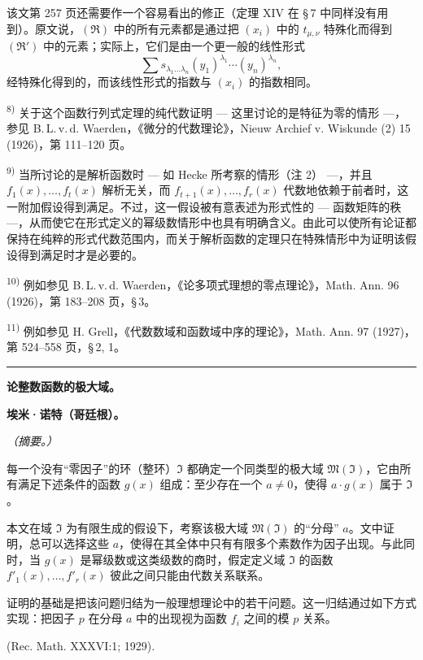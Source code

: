 {该文第 257 页还需要作一个容易看出的修正（定理 XIV 在 \S\,7 中同样没有用到）。原文说，$(\mathfrak{R})$ 中的所有元素都是通过把 $(x_i)$ 中的 $t_{\mu,\nu}$ 特殊化而得到 $(\mathfrak{R}')$ 中的元素；实际上，它们是由一个更一般的线性形式
\[
\sum s_{\lambda_1\ldots\lambda_n}(y_1)^{\lambda_1}\cdots(y_n)^{\lambda_n},
\]
经特殊化得到的，而该线性形式的指数与 $(x_i)$ 的指数相同。

\noindent\textsuperscript{8)} 关于这个函数行列式定理的纯代数证明 --- 这里讨论的是特征为零的情形 ---，参见 B.\,L.\,v.\,d. Waerden，《微分的代数理论》，Nieuw Archief v. Wiskunde (2) 15 (1926)，第 111--120 页。

\noindent\textsuperscript{9)} 当所讨论的是解析函数时 --- 如 Hecke 所考察的情形（注 2） ---，并且 $f_1(x),\ldots,f_t(x)$ 解析无关，而 $f_{t+1}(x),\ldots,f_r(x)$ 代数地依赖于前者时，这一附加假设得到满足。不过，这一假设被有意表述为形式性的 --- 函数矩阵的秩 ---，从而使它在形式定义的幂级数情形中也具有明确含义。由此可以使所有论证都保持在纯粹的形式代数范围内，而关于解析函数的定理只在特殊情形中为证明该假设得到满足时才是必要的。

\noindent\textsuperscript{10)} 例如参见 B.\,L.\,v.\,d. Waerden，《论多项式理想的零点理论》，Math. Ann. 96 (1926)，第 183--208 页，\S\,3。

\noindent\textsuperscript{11)} 例如参见 H. Grell，《代数数域和函数域中序的理论》，Math. Ann. 97 (1927)，第 524--558 页，\S\,2, 1。
}

\bigskip
\begin{center}\rule{4cm}{0.4pt}\end{center}
\begingroup
{}
\begin{center}
{\Large\bfseries 论整数函数的极大域。}\par
\vspace{0.7em}
{\bfseries 埃米·诺特（哥廷根）。}\par
\vspace{0.5em}
\emph{（摘要。）}
\end{center}

每一个没有“零因子”的环（整环）$\mathfrak{I}$ 都确定一个同类型的极大域 $\mathfrak{M}(\mathfrak{I})$，它由所有满足下述条件的函数 $g(x)$ 组成：至少存在一个 $a\ne0$，使得 $a\cdot g(x)$ 属于 $\mathfrak{I}$。

本文在域 $\mathfrak{I}$ 为有限生成的假设下，考察该极大域 $\mathfrak{M}(\mathfrak{I})$ 的“分母” $a$。文中证明，总可以选择这些 $a$，使得在其全体中只有有限多个素数作为因子出现。与此同时，当 $g(x)$ 是幂级数或这类级数的商时，假定定义域 $\mathfrak{I}$ 的函数 $f'_1(x),\ldots,f'_r(x)$ 彼此之间只能由代数关系联系。

证明的基础是把该问题归结为一般理想理论中的若干问题。这一归结通过如下方式实现：把因子 $p$ 在分母 $a$ 中的出现视为函数 $f_i$ 之间的模 $p$ 关系。

\begin{center}
(Rec. Math. XXXVI:1; 1929).
\end{center}
\endgroup

\setcounter{footnote}{0}
\clearpage

